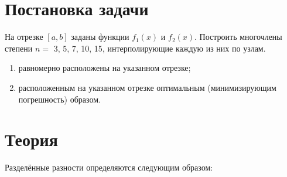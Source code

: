 \documentclass[12pt, a4paper]{article}
\begin{document}
	
	\begin{titlepage}
	\end{titlepage}
	
\tableofcontents
	
\section{Постановка задачи}
	
На отрезке $[a,b]$ заданы функции $f_1(x)$ и  $f_2(x)$. Построить многочлены степени $n =$ 3,  5,  7, 10, 15, интерполирующие каждую из них по узлам.
	
\begin{enumerate}
	\item равномерно расположены на указанном отрезке;
	\item расположенным на указанном отрезке оптимальным (минимизирующим погрешность) образом.
\end{enumerate}	

\section{Теория}

Разделённые разности определяются следующим образом:
\end{document}
